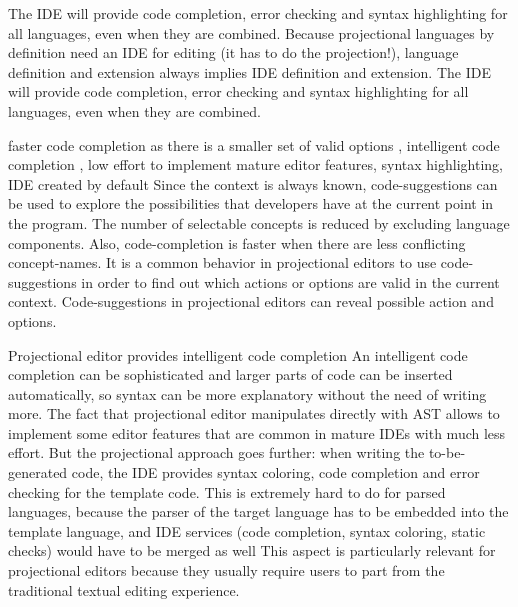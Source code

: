 The IDE will provide code completion, error checking and syntax highlighting for all languages, even when they are combined.
Because projectional languages by definition need an IDE for editing (it has to do the projection!), language definition and extension always implies IDE definition and extension.
The IDE will provide code completion, error checking and syntax highlighting for all languages, even when they are combined.

faster code completion as there is a smaller set of valid options  , intelligent code completion , low effort to implement mature editor features, syntax highlighting, IDE created by default
Since the context is always known, code-suggestions can be used to explore the possibilities that developers have at the current point in the program.
The number of selectable concepts is reduced by excluding language components.
Also, code-completion is faster when there are less conflicting concept-names.
It is a common behavior in projectional editors to use code-suggestions in order to find out which actions or options are valid in the current context. 
Code-suggestions in projectional editors can reveal possible action and options.

Projectional editor provides intelligent code completion 
An intelligent code completion can be sophisticated and larger parts of code can be inserted automatically, so syntax can be more explanatory without the need of writing more.
The fact that projectional editor manipulates directly with AST allows to implement some editor features that are common in mature IDEs with much less effort.
But the projectional approach goes further: when writing the to-be-generated code, the IDE provides syntax coloring, code completion and error checking for the template code.
This is extremely hard to do for parsed languages, because the parser of the target language has to be embedded into the template language, and IDE services (code completion, syntax coloring, static checks) would have to be merged as well
This aspect is particularly relevant for projectional editors because they usually require users to part from the traditional textual editing experience.


